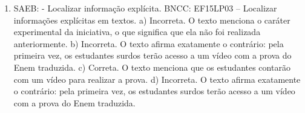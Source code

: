 \begin{enumerate}
\item
SAEB: - Localizar informação explícita. BNCC: EF15LP03 -- Localizar informações explícitas em textos. a) Incorreta. O texto menciona o caráter experimental da iniciativa, o que significa que ela não foi realizada anteriormente. b) Incorreta. O texto afirma exatamente o contrário: pela primeira vez, os estudantes surdos terão acesso a um vídeo com a prova do Enem traduzida. c) Correta. O texto menciona que os estudantes contarão com um vídeo para realizar a prova. d) Incorreta. O texto afirma exatamente o contrário: pela primeira vez, os estudantes surdos terão acesso a um vídeo com a prova do Enem traduzida.
\end{enumerate}